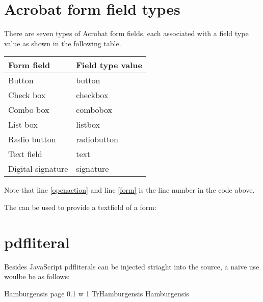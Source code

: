 \begin{multicols}{2}
\section{Acrobat form field types}
There are seven types of Acrobat form fields, each associated with a field type value as shown in the following table.
\medskip
{\centering
\begin{tabular}{ll}
\toprule
Form field &Field type value\\
\midrule
Button &button\\
Check box &checkbox\\
Combo box &combobox\\
List box &listbox\\
Radio button &radiobutton\\
Text field &text\\
Digital signature &signature\\
\bottomrule
\end{tabular}
\par
}
\bigskip

Note that line  \ref{openaction} and line \ref{form} is the line number in the code above.

The  can be used to provide a textfield of a form:


\clearpage

\section{pdfliteral}

Besides JavaScript pdfliterals can be injected striaght into the source,
a naive use woulbe be as follows:

\begin{teXXX}
Hamburgensis
\pdfsave\pdfliteral page {0.1 w 1 Tr}Hamburgensis\pdfrestore
Hamburgensis
\end{teXXX}


{}

\normalsize

\end{multicols}

